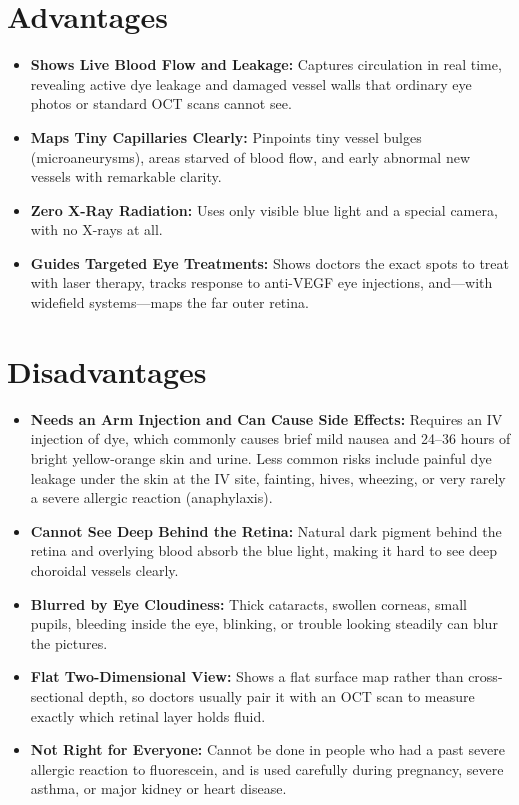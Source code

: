 \section{Advantages}

\begin{itemize}
    \item \textbf{Shows Live Blood Flow and Leakage:} Captures circulation in real time, revealing active dye leakage and damaged vessel walls that ordinary eye photos or standard OCT scans cannot see.
    \item \textbf{Maps Tiny Capillaries Clearly:} Pinpoints tiny vessel bulges (microaneurysms), areas starved of blood flow, and early abnormal new vessels with remarkable clarity.
    \item \textbf{Zero X-Ray Radiation:} Uses only visible blue light and a special camera, with no X-rays at all.
    \item \textbf{Guides Targeted Eye Treatments:} Shows doctors the exact spots to treat with laser therapy, tracks response to anti-VEGF eye injections, and---with widefield systems---maps the far outer retina.
\end{itemize}

\section{Disadvantages}

\begin{itemize}
    \item \textbf{Needs an Arm Injection and Can Cause Side Effects:} Requires an IV injection of dye, which commonly causes brief mild nausea and 24--36 hours of bright yellow-orange skin and urine. Less common risks include painful dye leakage under the skin at the IV site, fainting, hives, wheezing, or very rarely a severe allergic reaction (anaphylaxis).
    \item \textbf{Cannot See Deep Behind the Retina:} Natural dark pigment behind the retina and overlying blood absorb the blue light, making it hard to see deep choroidal vessels clearly.
    \item \textbf{Blurred by Eye Cloudiness:} Thick cataracts, swollen corneas, small pupils, bleeding inside the eye, blinking, or trouble looking steadily can blur the pictures.
    \item \textbf{Flat Two-Dimensional View:} Shows a flat surface map rather than cross-sectional depth, so doctors usually pair it with an OCT scan to measure exactly which retinal layer holds fluid.
    \item \textbf{Not Right for Everyone:} Cannot be done in people who had a past severe allergic reaction to fluorescein, and is used carefully during pregnancy, severe asthma, or major kidney or heart disease.
\end{itemize}

